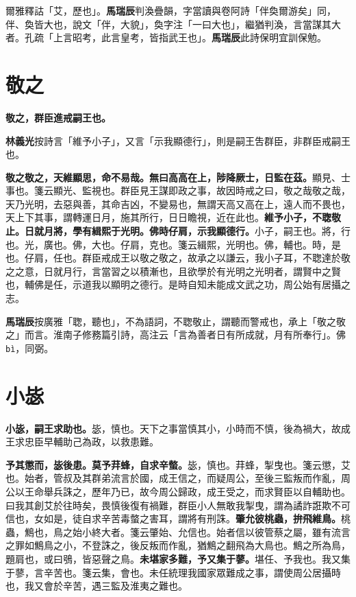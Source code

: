 \begin{quoting}爾雅釋詁「艾，歷也」。\textbf{馬瑞辰}判渙疊韻，字當讀與卷阿詩「伴奐爾游矣」同，伴、奐皆大也，說文「伴，大貌」，奐字注「一曰大也」，繼猶判渙，言當謀其大者。孔疏「上言昭考，此言皇考，皆指武王也」。\textbf{馬瑞辰}此詩保明宜訓保勉。\end{quoting}

\section{敬之}


\textbf{敬之，群臣進戒嗣王也。}

\begin{quoting}\textbf{林義光}按詩言「維予小子」，又言「示我顯德行」，則是嗣王吿群臣，非群臣戒嗣王也。\end{quoting}

\textbf{敬之敬之，天維顯思，命不易哉。無曰高高在上，陟降厥士，日監在茲。}{\footnotesize 顯見、士事也。箋云顯光、監視也。群臣見王謀即政之事，故因時戒之曰，敬之哉敬之哉，天乃光明，去惡與善，其命吉凶，不變易也，無謂天高又高在上，遠人而不畏也，天上下其事，謂轉運日月，施其所行，日日瞻視，近在此也。}\textbf{維予小子，不聦敬止。日就月將，學有緝熙于光明。佛時仔肩，示我顯德行。}{\footnotesize 小子，嗣王也。將，行也。光，廣也。佛，大也。仔肩，克也。箋云緝熙，光明也。佛，輔也。時，是也。仔肩，任也。群臣戒成王以敬之敬之，故承之以謙云，我小子耳，不聦達於敬之之意，日就月行，言當習之以積漸也，且欲學於有光明之光明者，謂賢中之賢也，輔佛是任，示道我以顯明之德行。是時自知未能成文武之功，周公始有居攝之志。}

\begin{quoting}\textbf{馬瑞辰}按廣雅「聦，聽也」，不為語詞，不聦敬止，謂聽而警戒也，承上「敬之敬之」而言。淮南子修務篇引詩，高注云「言為善者日有所成就，月有所奉行」。佛 \texttt{bì}，同弼。\end{quoting}

\section{小毖}


\textbf{小毖，嗣王求助也。}{\footnotesize 毖，慎也。天下之事當慎其小，小時而不慎，後為禍大，故成王求忠臣早輔助己為政，以救患難。}

\textbf{予其懲而，毖後患。莫予荓蜂，自求辛螫。}{\footnotesize 毖，慎也。荓蜂，掣曳也。箋云懲，艾也。始者，管叔及其群弟流言於國，成王信之，而疑周公，至後三監叛而作亂，周公以王命舉兵誅之，歷年乃已，故今周公歸政，成王受之，而求賢臣以自輔助也。曰我其創艾於往時矣，畏慎後復有禍難，群臣小人無敢我掣曳，謂為譎詐誑欺不可信也，女如是，徒自求辛苦毒螫之害耳，謂將有刑誅。}\textbf{肇允彼桃蟲，拚飛維鳥。}{\footnotesize 桃蟲，鷦也，鳥之始小終大者。箋云肇始、允信也。始者信以彼管蔡之屬，雖有流言之罪如鷦鳥之小，不登誅之，後反叛而作亂，猶鷦之翻飛為大鳥也。鷦之所為鳥，題肩也，或曰鴞，皆惡聲之鳥。}\textbf{未堪家多難，予又集于蓼。}{\footnotesize 堪任、予我也。我又集于蓼，言辛苦也。箋云集，會也。未任統理我國家眾難成之事，謂使周公居攝時也，我又會於辛苦，遇三監及淮夷之難也。}

